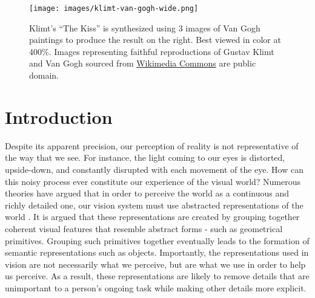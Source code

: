 \documentclass[a4paper,10pt,final]{ThesisStyle}
\begin{document}
\minitoc




\begin{figure}[ht]
 \texttt{[image: images/klimt-van-gogh-wide.png]}
 \caption{Klimt's ``The Kiss'' is synthesized using 3 images of Van Gogh paintings to produce the result on the right.  Best viewed in color at 400\%.  Images representing faithful reproductions of Gustav Klimt and Van Gogh sourced from \href{http://commons.wikimedia.org}{Wikimedia Commons} are public domain.}
 \label{fig:teaser}
\end{figure}


\section{Introduction}  
Despite its apparent precision, our perception of reality is not representative of the way that we see.  For instance, the light coming to our eyes is distorted, upside-down, and constantly disrupted with each movement of the eye.  How can this noisy process ever constitute our experience of the visual world?  Numerous theories have argued that in order to perceive the world as a continuous and richly detailed one, our vision system must use abstracted representations of the world \cite{Marr1982}.  It is argued that these representations are created by grouping together coherent visual features that resemble abstract forms - such as geometrical primitives. Grouping such primitives together eventually leads to the formation of semantic representations such as objects. Importantly, the representations used in vision are not necessarily what we perceive, but are what we use in order to help us perceive. As a result, these representations are likely to remove details that are unimportant to a person's ongoing task while making other details more explicit.
\end{document}
